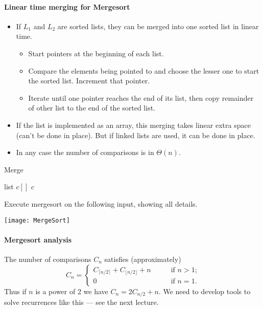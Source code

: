 \paragraph{Linear time merging for Mergesort}
\begin{itemize}
\item If $L_1$ and $L_2$ are sorted lists, they can be merged into one sorted 
list in linear time.
\begin{itemize}
\item Start pointers at the beginning of each list. 
\item Compare the elements being pointed 
to and choose the lesser one to start the sorted list. Increment that pointer. 
\item Iterate until one pointer reaches the end of its list, then 
copy remainder of other list to the end of the sorted list.
\end{itemize} 
\item If the list is implemented as an array, this merging takes linear extra 
space (can't be done in place). But if linked lists are used, it can be done in 
place.
\item In any case the number of comparisons is in $\Theta(n)$.
\end{itemize}

\begin{algorithm}[H]
  \caption{Merge}
    \label{alg:merge}
\begin{algorithmic}[0]
	\State list $c[]$
			\State \Return $c$
		\EndIf
 	\EndWhile
\EndFunction  
\end{algorithmic}
\end{algorithm}
\fi
\begin{Boxample}[0]
Execute mergesort on the following input, showing all details.
\begin{center}
\texttt{[image: MergeSort]} 
\end{center}
\end{Boxample}

\paragraph{Mergesort analysis}
The number of comparisons $C_n$ satisfies (approximately)
$$ C_n  = \left\{
\begin{array}{ll}
	C_{\lceil n/2 \rceil} + C_{\lfloor n/2 \rfloor} + n & \qquad \text{if }n > 1\text{;} \\
														0 & \qquad \text{if }n = 1\text{.}
\end{array}\right.$$
Thus if $n$ is a power of 2 we have $C_n = 2C_{n/2} + n$. We need to develop tools to solve recurrences like this --- see the next lecture.

